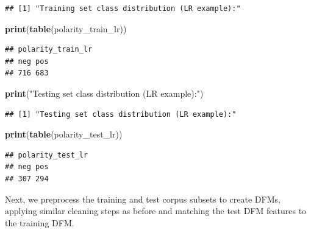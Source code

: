 \documentclass[
]{book}
\newenvironment{Shaded}{\begin{snugshade}}{\end{snugshade}}
\newcommand{\FunctionTok}[1]{\textcolor[rgb]{0.13,0.29,0.53}{\textbf{#1}}}
\newcommand{\NormalTok}[1]{#1}
\newcommand{\StringTok}[1]{\textcolor[rgb]{0.31,0.60,0.02}{#1}}
\begin{document}
\begin{verbatim}
## [1] "Training set class distribution (LR example):"
\end{verbatim}

\begin{Shaded}
\begin{Highlighting}[]
\FunctionTok{print}\NormalTok{(}\FunctionTok{table}\NormalTok{(polarity\_train\_lr))}
\end{Highlighting}
\end{Shaded}

\begin{verbatim}
## polarity_train_lr
## neg pos 
## 716 683
\end{verbatim}

\begin{Shaded}
\begin{Highlighting}[]
\FunctionTok{print}\NormalTok{(}\StringTok{"Testing set class distribution (LR example):"}\NormalTok{)}
\end{Highlighting}
\end{Shaded}

\begin{verbatim}
## [1] "Testing set class distribution (LR example):"
\end{verbatim}

\begin{Shaded}
\begin{Highlighting}[]
\FunctionTok{print}\NormalTok{(}\FunctionTok{table}\NormalTok{(polarity\_test\_lr))}
\end{Highlighting}
\end{Shaded}

\begin{verbatim}
## polarity_test_lr
## neg pos 
## 307 294
\end{verbatim}

Next, we preprocess the training and test corpus subsets to create DFMs, applying similar cleaning steps as before and matching the test DFM features to the training DFM.
\end{document}
